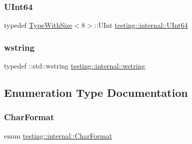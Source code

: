 \mbox{\label{namespacetesting_1_1internal_aa6a1ac454e6d7e550fa4925c62c35caa}} 
\subsubsection{\texorpdfstring{UInt64}{UInt64}}
{\footnotesize\ttfamily typedef \mbox{\hyperlink{classtesting_1_1internal_1_1TypeWithSize}{Type\+With\+Size}}$<$8$>$\+::U\+Int \mbox{\hyperlink{namespacetesting_1_1internal_aa6a1ac454e6d7e550fa4925c62c35caa}{testing\+::internal\+::\+U\+Int64}}}

\mbox{\label{namespacetesting_1_1internal_a3f543179329c353aee1d7b54a9a8e335}} 
\subsubsection{\texorpdfstring{wstring}{wstring}}
{\footnotesize\ttfamily typedef \+::std\+::wstring \mbox{\hyperlink{namespacetesting_1_1internal_a3f543179329c353aee1d7b54a9a8e335}{testing\+::internal\+::wstring}}}



\subsection{Enumeration Type Documentation}
\mbox{\label{namespacetesting_1_1internal_ae2ef98247c76a50cdc80ceb4a6c81793}} 
\subsubsection{\texorpdfstring{CharFormat}{CharFormat}}
{\footnotesize\ttfamily enum \mbox{\hyperlink{namespacetesting_1_1internal_ae2ef98247c76a50cdc80ceb4a6c81793}{testing\+::internal\+::\+Char\+Format}}}

